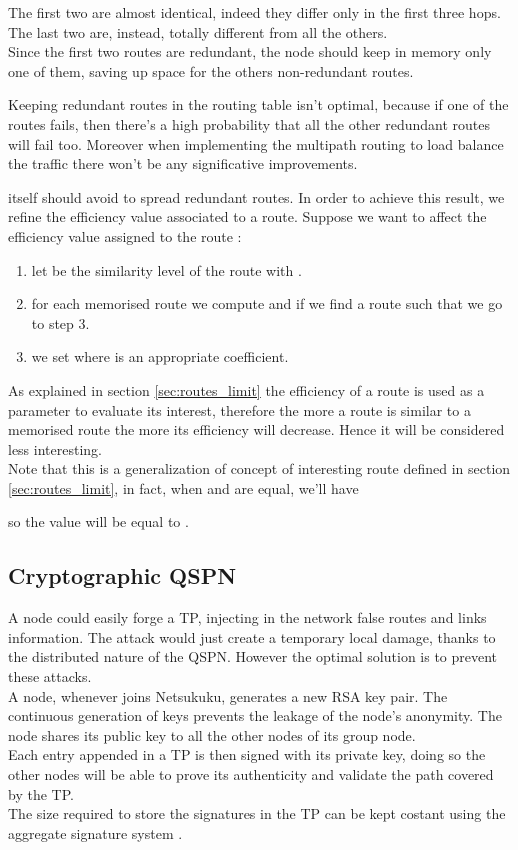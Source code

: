 \documentclass[a4paper]{article}
\begin{document}
The first two are almost identical, indeed they differ only in the first three
hops. The last two are, instead, totally different from all the others.\\
Since the first two routes are redundant, the node  should keep in memory only
one of them, saving up space for the others non-redundant routes.
\newline

Keeping redundant routes in the routing table isn't optimal, because if one of the
routes fails, then there's a high probability that all the other redundant
routes will fail too. Moreover when implementing the multipath routing to load
balance the traffic there won't be any significative improvements.
\newline

 itself should avoid to spread redundant routes. In order to achieve
this result, we refine the efficiency value associated to a route. Suppose we
want to affect the efficiency value  assigned to the route :
\begin{enumerate}
	\item let  be the similarity level of the route 
		with .
	\item for each memorised route  we compute  and if we find
		a route  such that  we go to step 3.
	\item we set  where  is an appropriate
		coefficient.
\end{enumerate}
As explained in section \ref{sec:routes_limit} the efficiency of a route is
used as a parameter to evaluate its interest, therefore the more a route is
similar to a memorised route the more its efficiency will decrease. Hence it
will be considered less interesting.\\
Note that this is a generalization of concept of interesting route defined in
section \ref{sec:routes_limit}, in fact, when  and  are equal, we'll
have

so the  value will be equal to .

\subsection{Cryptographic QSPN}
A node could easily forge a TP, injecting in the network false routes and
links information. The attack would just create a temporary local damage,
thanks to the distributed nature of the QSPN. However the optimal solution is
to prevent these attacks.\\

A node, whenever joins Netsukuku, generates a new RSA key pair. The
continuous generation of keys prevents the leakage of the node's anonymity.
The node shares its public key to all the other nodes of its group node.\\
Each entry appended in a TP is then signed with its private key, doing so the
other nodes will be able to prove its authenticity and validate the path
covered by the TP.\\
The size required to store the signatures in the TP can be kept costant using the
aggregate signature system \cite{aggrsign1} \cite{aggrsign2}.
\end{document}
